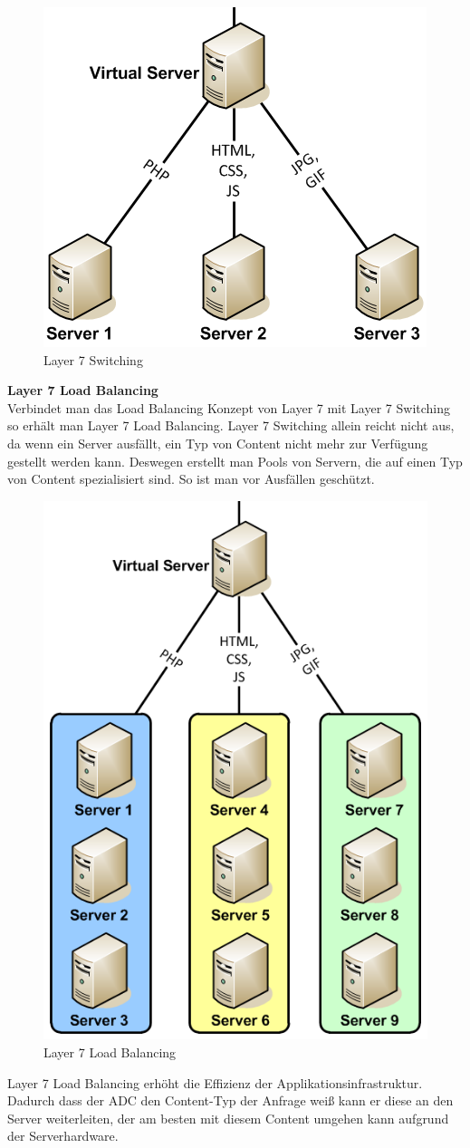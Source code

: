 \begin{figure}[!h]
	\begin{center}
		\includegraphics[width=0.3\linewidth]{images/loadbalancing5.jpg}
		\caption{Layer 7 Switching \cite{LoadBalancing3}}
		\label{Layer 7 Switching}
	\end{center}
\end{figure}

\textbf{Layer 7 Load Balancing} \\
Verbindet man das Load Balancing Konzept von Layer 7 mit Layer 7 Switching so erhält man Layer 7 Load Balancing. Layer 7 Switching allein reicht nicht aus, da wenn ein Server ausfällt, ein Typ von Content nicht mehr zur Verfügung gestellt werden kann. Deswegen erstellt man Pools von Servern, die auf einen Typ von Content spezialisiert sind. So ist man vor Ausfällen geschützt. 
\pagebreak
\begin{figure}[!h]
	\begin{center}
		\includegraphics[width=0.3\linewidth]{images/loadbalancing6.jpg}
		\caption{Layer 7 Load Balancing \cite{LoadBalancing3}}
		\label{Layer 7 Load Balancing}
	\end{center}
\end{figure}

Layer 7 Load Balancing erhöht die Effizienz der Applikationsinfrastruktur. Dadurch dass der ADC den Content-Typ der Anfrage weiß kann er diese an den Server weiterleiten, der am besten mit diesem Content umgehen kann aufgrund der Serverhardware. \cite{LoadBalancing3}

